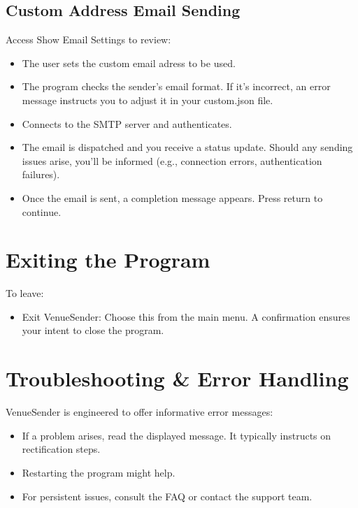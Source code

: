 \documentclass{article}
\begin{document}
	\subsection*{Custom Address Email Sending}
	Access Show Email Settings to review:
	\begin{itemize}
		\item The user sets the custom email adress to be used.
		\item The program checks the sender's email format. If it's incorrect, an error message instructs you to adjust it in your custom.json file.
		\item Connects to the SMTP server and authenticates.
		\item The email is dispatched and you receive a status update. Should any sending issues arise, you'll be informed (e.g., connection errors, authentication failures).
		\item Once the email is sent, a completion message appears. Press return to continue.
	\end{itemize}

	\section*{Exiting the Program}
	To leave:
	\begin{itemize}
		\item Exit VenueSender: Choose this from the main menu. A confirmation ensures your intent to close the program.
	\end{itemize}
	
	\section*{Troubleshooting \& Error Handling}
	VenueSender is engineered to offer informative error messages:
	\begin{itemize}
		\item If a problem arises, read the displayed message. It typically instructs on rectification steps.
		\item Restarting the program might help.
		\item For persistent issues, consult the FAQ or contact the support team.
	\end{itemize}
	
\end{document}

